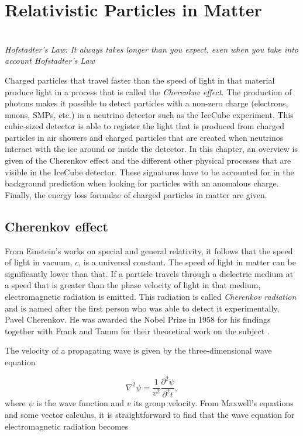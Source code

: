 \chapter{Relativistic Particles in Matter}
\label{ch:cherenkov}
\begin{flushright}
\textit{\\Hofstadter's Law: It always takes longer than you expect, even when you take into account Hofstadter's Law\\}
\end{flushright}

\noindent Charged particles that travel faster than the speed of light in that material produce light in a process that is called the \textit{Cherenkov effect}. The production of photons makes it possible to detect particles with a non-zero charge (electrons, muons, SMPs, etc.) in a neutrino detector such as the IceCube experiment. This cubic-sized detector is able to register the light that is produced from charged particles in air showers and charged particles that are created when neutrinos interact with the ice around or inside the detector. In this chapter, an overview is given of the Cherenkov effect and the different other physical processes that are visible in the IceCube detector. These signatures have to be accounted for in the background prediction when looking for particles with an anomalous charge. Finally, the energy loss formulae of charged particles in matter are given.


\section{Cherenkov effect}
\label{sec:cherenkoveffect}
From Einstein's works on special and general relativity, it follows that the speed of light in vacuum, $c$, is a universal constant. The speed of light in matter can be significantly lower than that. If a particle travels through a dielectric medium at a speed that is greater than the phase velocity of light in that medium, electromagnetic radiation is emitted. This radiation is called \textit{Cherenkov radiation} and is named after the first person who was able to detect it experimentally, Pavel Cherenkov. He was awarded the Nobel Prize in 1958 for his findings together with Frank and Tamm for their theoretical work on the subject \cite{nobel1958url}.

The velocity of a propagating wave is given by the three-dimensional wave equation

\begin{equation}
\nabla^2\psi = \frac{1}{v^2} \frac{\partial^2 \psi}{\partial^2 t},
\end{equation}
where $\psi$ is the wave function and $v$ its group velocity. From Maxwell's equations and some vector calculus, it is straightforward to find that the wave equation for electromagnetic radiation becomes

